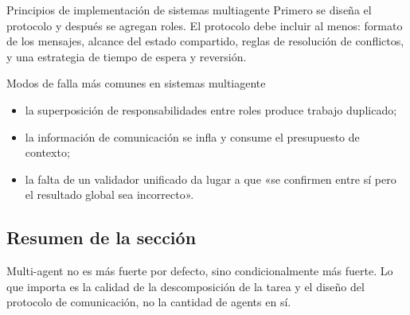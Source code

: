 \begin{importantbox}{Principios de implementación de sistemas multiagente}
Primero se diseña el protocolo y después se agregan roles. El protocolo debe incluir al menos: formato de los mensajes, alcance del estado compartido, reglas de resolución de conflictos, y una estrategia de tiempo de espera y reversión.
\end{importantbox}

\begin{warningbox}{Modos de falla más comunes en sistemas multiagente}
\begin{itemize}
    \item la superposición de responsabilidades entre roles produce trabajo duplicado;
    \item la información de comunicación se infla y consume el presupuesto de contexto;
    \item la falta de un validador unificado da lugar a que «se confirmen entre sí pero el resultado global sea incorrecto».
\end{itemize}
\end{warningbox}

\subsection{Resumen de la sección}
Multi-agent no es más fuerte por defecto, sino condicionalmente más fuerte. Lo que importa es la calidad de la descomposición de la tarea y el diseño del protocolo de comunicación, no la cantidad de agents en sí.

